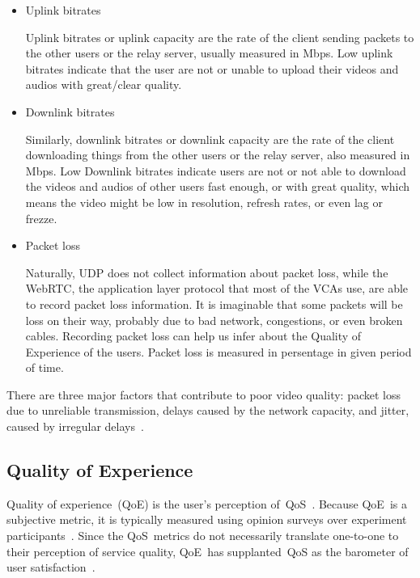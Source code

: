         \begin{itemize}
            \item Uplink bitrates
            
                Uplink bitrates or uplink capacity are the rate of the client sending packets to the other users or the relay server, usually measured in Mbps. Low uplink bitrates indicate that the user are not or unable to upload their videos and audios with great/clear quality. 

            \item Downlink bitrates
            
                Similarly, downlink bitrates or downlink capacity are the rate of the client downloading things from the other users or the relay server, also measured in Mbps. Low Downlink bitrates indicate users are not or not able to download the videos and audios of other users fast enough, or with great quality, which means the video might be low in resolution, refresh rates, or even lag or frezze.

            \item Packet loss
            
                Naturally, UDP does not collect information about packet loss, while the WebRTC, the application layer protocol that most of the VCAs use, are able to record packet loss information. It is imaginable that some packets will be loss on their way, probably due to bad network, congestions, or even broken cables. Recording packet loss can help us infer about the Quality of Experience of the users. Packet loss is measured in persentage in given period of time. 

        \end{itemize}

        

        There are three major factors that contribute to poor video quality: packet loss due to unreliable transmission, delays caused by the network capacity, and jitter, caused by irregular delays~\autocite{ChenYanjiao2015FQtQ}.

    \subsection{Quality of Experience}\label{introduction:qoe}
        Quality of experience~(QoE) is the user's perception of~QoS~\autocite{ChenYanjiao2015FQtQ}. Because QoE~is a subjective metric, it is typically measured using opinion surveys over experiment participants~\autocite{ChenYanjiao2015FQtQ,RodrriguezDemóstenesZ2014Vqai}. Since the QoS~metrics do not necessarily translate one-to-one to their perception of service quality, QoE~has supplanted~QoS as the barometer of user satisfaction~\autocite{DinakiHosseinEbrahimi2021FVQW}.

